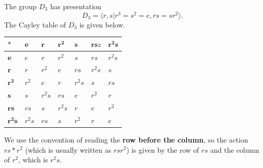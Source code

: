 \begin{example}\label{example-presentation-of-D3}
    The group $D_3$ has presentation
    \[
        D_3 = \langle r, s \vert r^3 = s^2 = e, rs = sr^2 \rangle.
    \]
    The Cayley table of $D_3$ is given below.

    \begin{table}[h]
        \centering
        \begin{tabular}{|l|l|l|l|l|l|l|}
        \hline
        $\boldsymbol{\ast}$ & $\boldsymbol{e}$ & $\boldsymbol{r}$ & $\boldsymbol{r^2}$ & $\boldsymbol{s}$ & $\boldsymbol{rs}z$ & $\boldsymbol{r^2s}$ \\ \hline
        $\boldsymbol{e}$    & $e$    & $r$    & $r^2$  & $s$    & $rs$   & $r^2s$ \\ \hline
        $\boldsymbol{r}$    & $r$    & $r^2$  & $e$    & $rs$   & $r^2s$ & $s$    \\ \hline
        $\boldsymbol{r^2}$  & $r^2$  & $e$    & $r$    & $r^2s$ & $s$    & $rs$   \\ \hline
        $\boldsymbol{s}$    & $s$    & $r^2s$ & $rs$   & $e$    & $r^2$  & $r$    \\ \hline
        $\boldsymbol{rs}$   & $rs$   & $s$    & $r^2s$ & $r$    & $e$    & $r^2$  \\ \hline
        $\boldsymbol{r^2s}$ & $r^2s$ & $rs$   & $s$    & $r^2$  & $r$    & $e$    \\ \hline
        \end{tabular}
    \end{table}

    We use the convention of reading the \textbf{row before the column}, so the action $rs \ast r^2$ (which is usually written as $rsr^2$) is given by the row of $rs$ and the column of $r^2$, which is $r^2s$.
\end{example}

